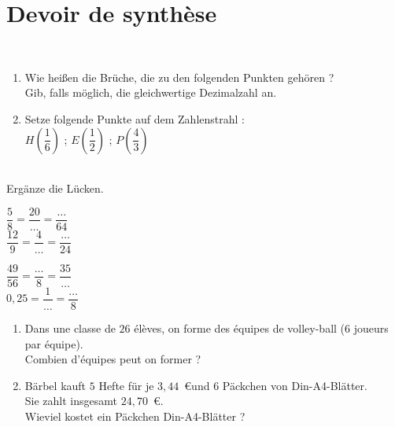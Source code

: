 \documentclass[10pt,openany]{book}
\begin{document}
\section*{Devoir de synth\`ese}

\begin{multicols}{2}
\\
\begin{enumerate}
\item Wie hei\ss en die Br\"uche, die zu den folgenden Punkten geh\"oren ?\\
  Gib, falls m\"oglich, die gleichwertige Dezimalzahl an.
  
\begin{DroiteGraduee}[none]{8}{0}{13}{1}{1}{0}{0}
\end{DroiteGraduee}

\columnbreak
\item Setze folgende Punkte auf dem Zahlenstrahl : \\
$H(\dfrac{1}{6})$ ; $E(\dfrac{1}{2})$ ; $P(\dfrac{4}{3})$

\begin{DroiteGraduee}[none]{8}{0}{13}{1}{1}{0}{0}
\end{DroiteGraduee}

\end{enumerate}

\end{multicols}

\\
Erg\"anze die L\"ucken.\\
\begin{multicols}{2}
$\dfrac{5}{8}=\dfrac{20}{\ldots}=\dfrac{\ldots}{64}$\\


$\dfrac{12}{9}=\dfrac{4}{\ldots}=\dfrac{\ldots}{24}$
\columnbreak

$\dfrac{49}{56}=\dfrac{\ldots}{8}=\dfrac{35}{\ldots}$\\

$0,25=\dfrac{1}{\ldots}=\dfrac{\ldots}{8}$

\end{multicols}

\begin{enumerate}
\item Dans une classe de $26$ \'el\`eves, on forme des \'equipes de volley-ball ($6$ joueurs par \'equipe).\\
Combien d'\'equipes peut on former ?

\item B\"arbel kauft $5$ Hefte f\"ur  je $3,44$~\euro und $6$ P\"ackchen von Din-A4-Bl\"atter.\\
Sie zahlt insgesamt $24,70$~\euro.\\
Wieviel kostet ein P\"ackchen Din-A4-Bl\"atter ?
\end{enumerate}
\end{document}
